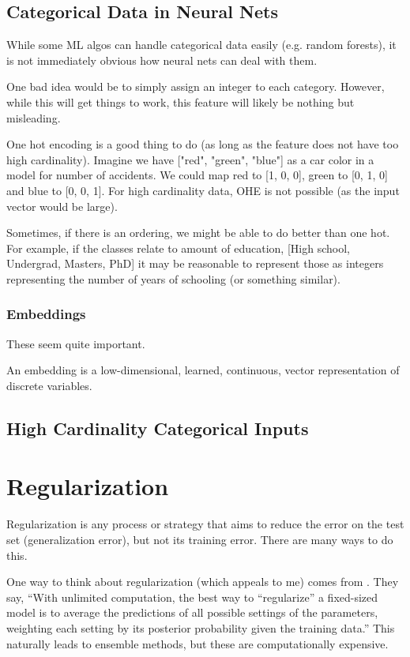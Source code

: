 \documentclass{article}
\begin{document}
\subsection{Categorical Data in Neural Nets}

While some ML algos can handle categorical data easily (e.g. random forests), it is not immediately obvious how neural nets can deal with them.

One bad idea would be to simply assign an integer to each category. However, while this will get things to work, this feature will likely be nothing but misleading.

One hot encoding is a good thing to do (as long as the feature does not have too high cardinality). Imagine we have ["red", "green", "blue"] as a car color in a model for number of accidents. We could map red to [1, 0, 0], green to [0, 1, 0] and blue to [0, 0, 1].
For high cardinality data, OHE is not possible (as the input vector would be large).

Sometimes, if there is an ordering, we might be able to do better than one hot. For example, if the classes relate to amount of education, [High school, Undergrad, Masters, PhD] it may be reasonable to represent those as integers representing the number of years of schooling (or something similar).

\subsubsection{Embeddings}

These seem quite important.

An embedding is a low-dimensional, learned, continuous, vector representation of discrete variables.

\subsection{High Cardinality Categorical Inputs}


\section{Regularization}

Regularization is any process or strategy that aims to reduce the error on the test set (generalization error), but not its training error.
There are many ways to do this.

One way to think about regularization (which appeals to me) comes from \citet{Srivastava2014}. They say,
``With unlimited computation, the best way to “regularize” a fixed-sized model is to
average the predictions of all possible settings of the parameters, weighting each setting by its posterior probability given the training data.''
This naturally leads to ensemble methods, but these are computationally expensive.
\end{document}
